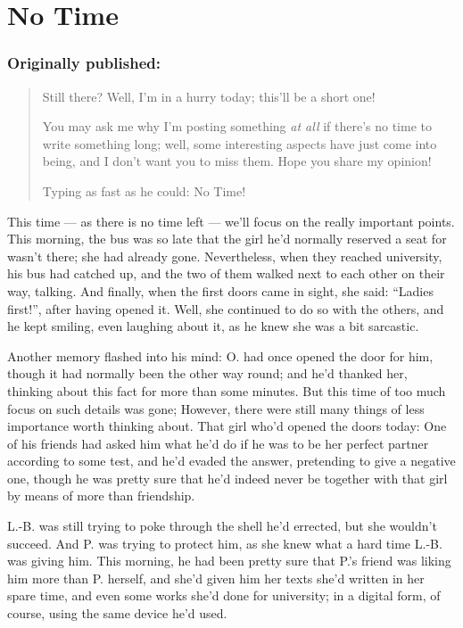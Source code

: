 \chapter{No Time}
\label{cha:no-time}
\subsection*{Originally published: }
\begin{quote}
Still there? Well, I'm in a hurry today; this'll be a short one!

You may ask me why I'm posting something \emph{at all} if there's no time to write something long; well, some interesting aspects have just come into being, and I don't want you to miss them. Hope you share my opinion!

Typing as fast as he could: No Time!
\end{quote}

This time --- as there is no time left --- we'll focus on the really important points. 
This morning, the bus was so late that the girl he'd normally reserved a seat for wasn't there; she had already gone. Nevertheless, when they reached university, his bus had catched up, and the two of them walked next to each other on their way, talking. And finally, when the first doors came in sight, she said: \enquote{Ladies first!}, after having opened it. Well, she continued to do so with the others, and he kept smiling, even laughing about it, as he knew she was a bit sarcastic.

Another memory flashed into his mind: O. had once opened the door for him, though it had normally been the other way round; and he'd thanked her, thinking about this fact for more than some minutes. But this time of too much focus on such details was gone; However, there were still many things of less importance worth thinking about. 
That girl who'd opened the doors today: One of his friends had asked him what he'd do if he was to be her perfect partner according to some test, and he'd evaded the answer, pretending to give a negative one, though he was pretty sure that he'd indeed never be together with that girl by means of more than friendship.

L.-B. was still trying to poke through the shell he'd errected, but she wouldn't succeed. And P. was trying to protect him, as she knew what a hard time L.-B. was giving him. 
This morning, he had been pretty sure that P.'s friend was liking him more than P. herself, and she'd given him her texts she'd written in her spare time, and even some works she'd done for university; in a digital form, of course, using the same device he'd used.

